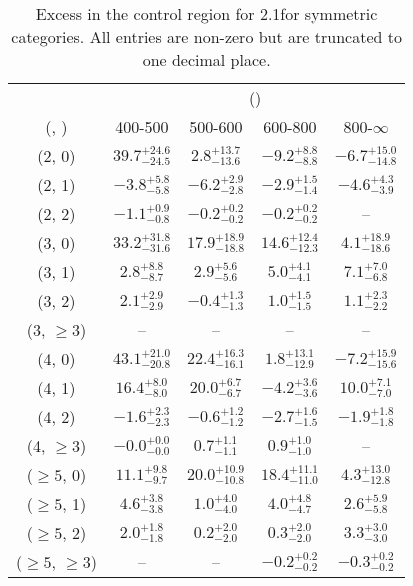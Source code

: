 \begin{table}[h!]
\tiny
\centering
\caption{Excess in the \gj control region for 2.1\ifb for symmetric categories. All entries are non-zero but are truncated to one decimal place.\label{tab:excesssepnaive_gj_ewk_sym}}
\begin{tabular}
{ccccc}
	\hline\hline
	& \multicolumn{4}{c}{\scalht (\gev)} \\ 
	 (\njet,  \nb) & 400-500 & 500-600 & 600-800 & 800-$\infty$ \\ [0.8ex] 
\hline
	(2, 0) & $39.7^{+ 24.6 }_{- 24.5 }$ & $2.8^{+ 13.7 }_{- 13.6 }$ & $-9.2^{+ 8.8 }_{- 8.8 }$ & $-6.7^{+ 15.0 }_{- 14.8 }$ \\[0.5ex] 
	(2, 1) & $-3.8^{+ 5.8 }_{- 5.8 }$ & $-6.2^{+ 2.9 }_{- 2.8 }$ & $-2.9^{+ 1.5 }_{- 1.4 }$ & $-4.6^{+ 4.3 }_{- 3.9 }$ \\[0.5ex] 
	(2, 2) & $-1.1^{+ 0.9 }_{- 0.8 }$ & $-0.2^{+ 0.2 }_{- 0.2 }$ & $-0.2^{+ 0.2 }_{- 0.2 }$ & -- \\[0.5ex] 
	(3, 0) & $33.2^{+ 31.8 }_{- 31.6 }$ & $17.9^{+ 18.9 }_{- 18.8 }$ & $14.6^{+ 12.4 }_{- 12.3 }$ & $4.1^{+ 18.9 }_{- 18.6 }$ \\[0.5ex] 
	(3, 1) & $2.8^{+ 8.8 }_{- 8.7 }$ & $2.9^{+ 5.6 }_{- 5.6 }$ & $5.0^{+ 4.1 }_{- 4.1 }$ & $7.1^{+ 7.0 }_{- 6.8 }$ \\[0.5ex] 
	(3, 2) & $2.1^{+ 2.9 }_{- 2.9 }$ & $-0.4^{+ 1.3 }_{- 1.3 }$ & $1.0^{+ 1.5 }_{- 1.5 }$ & $1.1^{+ 2.3 }_{- 2.2 }$ \\[0.5ex] 
	(3, $\ge3$) & -- & -- & -- & -- \\[0.5ex] 
	(4, 0) & $43.1^{+ 21.0 }_{- 20.8 }$ & $22.4^{+ 16.3 }_{- 16.1 }$ & $1.8^{+ 13.1 }_{- 12.9 }$ & $-7.2^{+ 15.9 }_{- 15.6 }$ \\[0.5ex] 
	(4, 1) & $16.4^{+ 8.0 }_{- 8.0 }$ & $20.0^{+ 6.7 }_{- 6.7 }$ & $-4.2^{+ 3.6 }_{- 3.6 }$ & $10.0^{+ 7.1 }_{- 7.0 }$ \\[0.5ex] 
	(4, 2) & $-1.6^{+ 2.3 }_{- 2.3 }$ & $-0.6^{+ 1.2 }_{- 1.2 }$ & $-2.7^{+ 1.6 }_{- 1.5 }$ & $-1.9^{+ 1.8 }_{- 1.8 }$ \\[0.5ex] 
	(4, $\ge3$) & $-0.0^{+ 0.0 }_{- 0.0 }$ & $0.7^{+ 1.1 }_{- 1.1 }$ & $0.9^{+ 1.0 }_{- 1.0 }$ & -- \\[0.5ex] 
	($\ge5$, 0) & $11.1^{+ 9.8 }_{- 9.7 }$ & $20.0^{+ 10.9 }_{- 10.8 }$ & $18.4^{+ 11.1 }_{- 11.0 }$ & $4.3^{+ 13.0 }_{- 12.8 }$ \\[0.5ex] 
	($\ge5$, 1) & $4.6^{+ 3.8 }_{- 3.8 }$ & $1.0^{+ 4.0 }_{- 4.0 }$ & $4.0^{+ 4.8 }_{- 4.7 }$ & $2.6^{+ 5.9 }_{- 5.8 }$ \\[0.5ex] 
	($\ge5$, 2) & $2.0^{+ 1.8 }_{- 1.8 }$ & $0.2^{+ 2.0 }_{- 2.0 }$ & $0.3^{+ 2.0 }_{- 2.0 }$ & $3.3^{+ 3.0 }_{- 3.0 }$ \\[0.5ex] 
	($\ge5$, $\ge3$) & -- & -- & $-0.2^{+ 0.2 }_{- 0.2 }$ & $-0.3^{+ 0.2 }_{- 0.2 }$ \\[0.5ex] 
	\hline
	\hline
\end{tabular}
\end{table}
